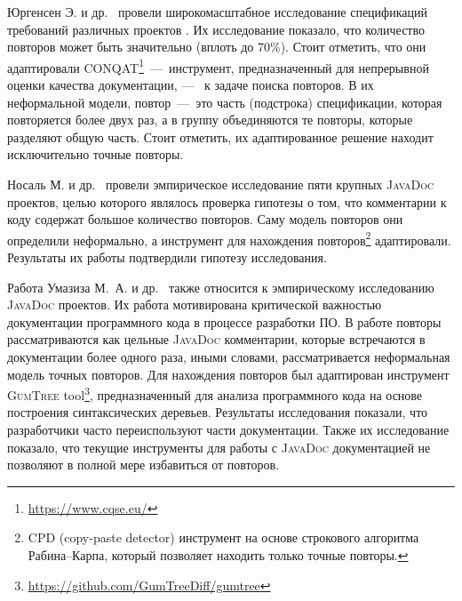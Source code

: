 Юргенсен Э. и др.~\cite{juergens2010can} провели широкомасштабное исследование спецификаций требований различных проектов . 
Их исследование показало, что количество повторов может быть значительно (вплоть до 70\%). 
Стоит отметить, что они адаптировали \textsc{CONQAT}\footnote{\url{https://www.cqse.eu/}}~---~инструмент, предназначенный для непрерывной оценки качества документации, ---~ к задаче поиска повторов.
В их неформальной модели, повтор~---~это часть (подстрока) спецификации, которая повторяется более двух раз, а в группу объединяются те повторы, которые разделяют общую часть.
Стоит отметить, их адаптированное решение находит исключительно точные повторы.

Носаль М. и др.~\cite{poruban2016preliminary} провели эмпирическое исследование пяти крупных \textsc{JavaDoc} проектов, целью которого являлось проверка гипотезы о том, что комментарии к коду содержат большое количество повторов.
Саму модель повторов они определили неформально, а инструмент для нахождения повторов\footnote{\textsc{CPD} (copy-paste detector) инструмент на основе строкового алгоритма Рабина--Карпа, который позволяет находить только точные повторы.} адаптировали.
Результаты их работы подтвердили гипотезу исследования. 

Работа Умазиза М.\, А. и др.~\cite{oumaziz2017documentation} также относится к эмпирическому исследованию \textsc{JavaDoc} проектов. 
Их работа мотивирована критической важностью документации программного кода в процессе разработки ПО.
В работе повторы рассматриваются как цельные \textsc{JavaDoc} комментарии, которые встречаются в документации более одного раза, иными словами, рассматривается неформальная модель точных повторов.
Для нахождения повторов был адаптирован инструмент \textsc{GumTree} tool\footnote{\url{https://github.com/GumTreeDiff/gumtree}}, предназначенный для анализа программного кода на основе построения синтаксических деревьев.
Результаты исследования показали, что разработчики часто переиспользуют части документации.
Также их исследование показало, что текущие инструменты для работы с \textsc{JavaDoc} документацией не позволяют в полной мере избавиться от повторов.


